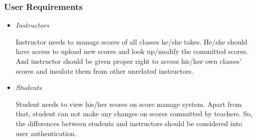 \documentclass[a4]{article}
\begin{document}
\subsubsection{User Requirements}
\begin{itemize}
\item

\emph{Instructors}

Instructor needs to manage scores of all classes he/she takes. He/she should have access to upload new scores and look up/modify the committed scores. And instructor should be given proper right to access his/her own classes' scores and insulate them from other
unrelated instructors.

\item\emph{Students}

Student needs to view his/her scores on score manage system. Apart from that, student can not make any changes on scores committed by teachers. So, the differences between students and instructors should be considered into user authentication.
\end{itemize}
\end{document}
